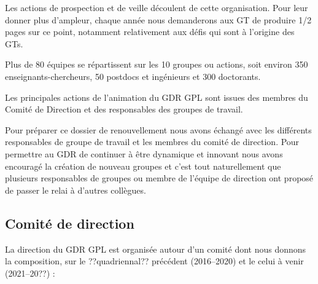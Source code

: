 \documentclass[11pt]{article}
\newcommand{\mynote}[3][black]{\textcolor{#1}{\fbox{\bfseries\sffamily\scriptsize{#2}}
{\small$\blacktriangleright$\textsf{\emph{#3}}$\blacktriangleleft$}}}
\newcommand{\pem}[1]{} %
\begin{document}
Les actions de prospection et de veille découlent de cette organisation. Pour leur donner plus d'ampleur, chaque année nous demanderons aux GT de produire 1/2 pages sur ce point, notamment relativement aux défis qui sont à l'origine des GTs.



Plus de 80 équipes se répartissent sur les 10 groupes ou actions,
soit environ 350 enseignants-chercheurs, 50 postdocs et ingénieurs et 300
doctorants.

Les principales actions de l'animation du GDR GPL sont issues des membres du
Comité de Direction et des responsables des groupes de travail. 

Pour préparer ce dossier de renouvellement nous avons échangé avec les différents
responsables de groupe de travail et les membres du comité de direction.
Pour permettre au GDR de continuer à être dynamique et innovant nous avons
encouragé la création de nouveau groupes et c'est tout naturellement que
plusieurs responsables de groupes ou membre de l'équipe de direction ont
proposé de passer le relai à d'autres collègues.


\subsection{Comité de direction}
La direction du GDR GPL est organisée autour d'un comité dont nous donnons la
composition, sur le ??quadriennal?? précédent (2016--2020) et le celui à venir
(2021--20??) :
\end{document}
